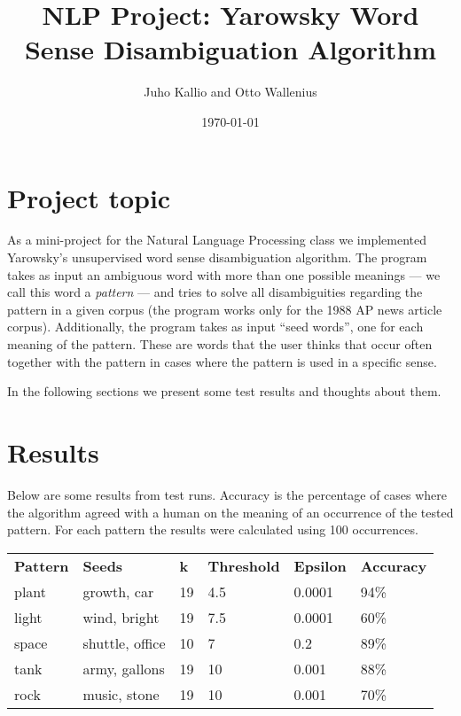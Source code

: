 \documentclass[finnish]{article}
\title{NLP Project: Yarowsky Word Sense Disambiguation Algorithm}
\author{Juho Kallio and Otto Wallenius}
\date{\today}
\begin{document}
\maketitle
\section{Project topic}
As a mini-project for the Natural Language Processing class we implemented Yarowsky's unsupervised word sense disambiguation algorithm. The program takes as input an ambiguous word with more than one possible meanings --- we call this word a \emph{pattern} --- and tries to solve all disambiguities regarding the pattern in a given corpus (the program works only for the 1988 AP news article corpus). Additionally, the program takes as input ``seed words'', one for each meaning of the pattern. These are words that the user thinks that occur often together with the pattern in cases where the pattern is used in a specific sense.

In the following sections we present some test results and thoughts about them.

\section{Results}
Below are some results from test runs. Accuracy is the percentage of cases where the algorithm agreed with a human on the meaning of an occurrence of the tested pattern. For each pattern the results were calculated using 100 occurrences.

\begin{tabular}{l l l l l l}

\textbf{Pattern} & \textbf{Seeds} & \textbf{k} & \textbf{Threshold} & \textbf{Epsilon} & \textbf{Accuracy} \\
plant   & growth, car     & 19 & 4.5 & 0.0001 & 94\% \\
light   & wind, bright    & 19 & 7.5 & 0.0001 & 60\% \\
space   & shuttle, office & 10 & 7   & 0.2    & 89\% \\
tank    & army, gallons   & 19 & 10  & 0.001  & 88\% \\
rock    & music, stone    & 19 & 10  & 0.001  & 70\%
\end{tabular}
\end{document}
